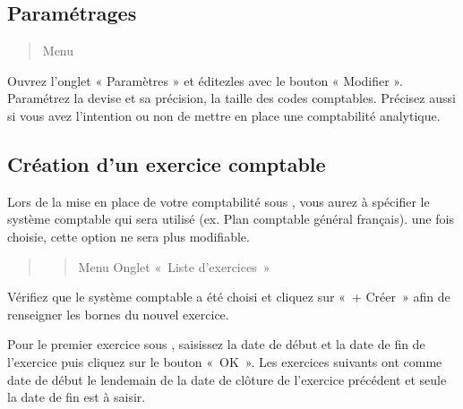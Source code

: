 \documentclass[a4paper,10pt,oneside,french]{sphinxmanual}
\begin{document}
\subsection{Paramétrages}
\label{\detokenize{accounting/fiscalyear:parametrages}}\begin{quote}

\sphinxAtStartPar
Menu 
\end{quote}

\sphinxAtStartPar
Ouvrez l’onglet « Paramètres » et éditez\sphinxhyphen{}les avec le bouton « Modifier ». Paramétrez la devise et sa précision, la taille des codes comptables. Précisez aussi si vous avez l’intention ou non de mettre en place une comptabilité analytique.
\begin{quote}

\noindent{}
\end{quote}


\subsection{Création d’un exercice comptable}
\label{\detokenize{accounting/fiscalyear:creation-d-un-exercice-comptable}}
\sphinxAtStartPar
Lors de la mise en place de votre comptabilité sous , vous aurez à spécifier le système comptable qui sera utilisé (ex. Plan comptable général français).  une fois choisie, cette option ne sera plus modifiable.
\begin{quote}
\begin{quote}

\sphinxAtStartPar
Menu  \sphinxhyphen{} Onglet « Liste d’exercices »
\end{quote}

\noindent{}
\end{quote}

\sphinxAtStartPar
Vérifiez que le système comptable a été choisi et cliquez sur « + Créer » afin de renseigner les bornes du nouvel exercice.
\begin{quote}

\noindent{}
\end{quote}

\sphinxAtStartPar
Pour le premier exercice sous , saisissez la date de début et la date de fin de l’exercice puis cliquez sur le bouton « OK ». Les exercices suivants ont comme date de début le lendemain de la date de clôture de l’exercice précédent et seule la date de fin est à saisir.
\end{document}

